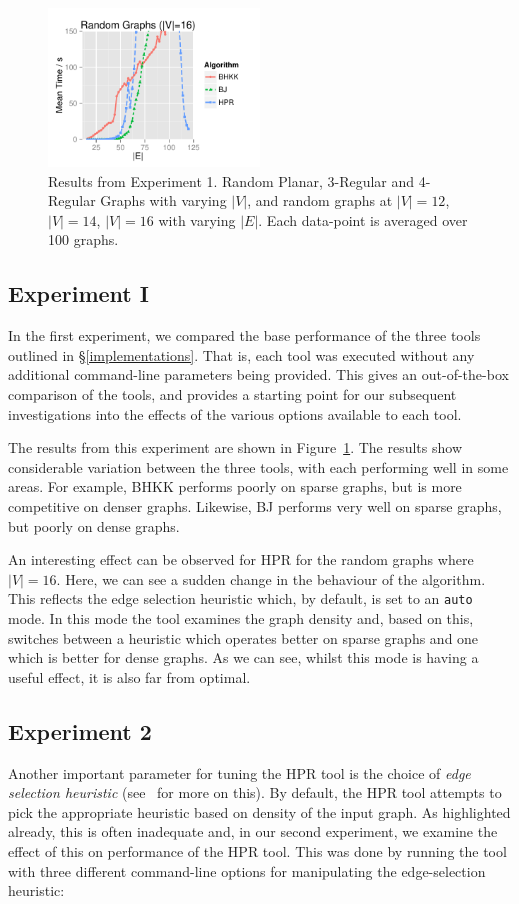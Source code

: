 \begin{figure}[!p]
\includegraphics[width=0.5\textwidth]{data/Exp1_random16_graphs.pdf}
\caption{Results from Experiment 1.  Random Planar, 3-Regular and 4-Regular Graphs with varying $|V|$, and random graphs at $|V|= 12$, $|V|= 14$, $|V|= 16$ with varying $|E|$.  Each data-point is averaged over 100 graphs.}
\label{experiment_1}
\end{figure}

\subsection{Experiment I}

In the first experiment, we compared the base performance of the three tools outlined in \S\ref{implementations}.  That is, each tool was executed without any additional command-line parameters being provided.  This gives an out-of-the-box comparison of the tools, and provides a starting point for our subsequent investigations into the effects of the various options available to each tool.

The results from this experiment are shown in Figure~\ref{experiment_1}.  The results show considerable variation between the three tools, with each performing well in some areas.  For example, BHKK performs poorly on sparse graphs, but is more competitive on denser graphs.  Likewise, BJ performs very well on sparse graphs, but poorly on dense graphs. 

An interesting effect can be observed for HPR for the random graphs where $|V|=16$.  Here, we can see a sudden change in the behaviour of the algorithm.  This reflects the edge selection heuristic which, by default, is set to an \verb+auto+ mode.  In this mode the tool examines the graph density and, based on this, switches between a heuristic which operates better on sparse graphs and one which is better for dense graphs.  As we can see, whilst this mode is having a useful effect, it is also far from optimal.

\subsection{Experiment 2}
Another important parameter for tuning the HPR tool is the choice of {\em edge selection heuristic} (see~\cite{PHR09} for more on this).  By default, the HPR tool attempts to pick the appropriate heuristic based on density of the input graph.  As highlighted already, this is often inadequate and, in our second experiment, we examine the effect of this on performance of the HPR tool.  This was done by running the tool with three different command-line options for manipulating the edge-selection heuristic:


